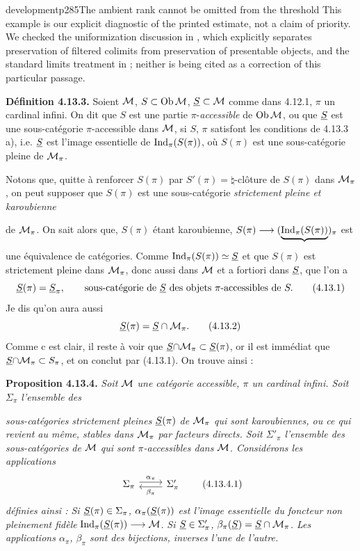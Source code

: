 \begin{dcomment}{development}{p285}{The ambient rank cannot be omitted from the threshold}
This example is our explicit diagnostic of the printed estimate, not a claim of priority. We checked the uniformization discussion in \citet[\S2.3]{Raptis2020}, which explicitly separates preservation of filtered colimits from preservation of presentable objects, and the standard limits treatment in \citet{Positselski2024Limits}; neither is being cited as a correction of this particular passage.
\end{dcomment}


\textbf{Définition 4.13.3.} Soient $\mathcal{M}$, $S \subset \operatorname{Ob}\mathcal{M}$, $\underline{S} \subset \mathcal{M}$ comme dans 4.12.1, $\pi$ un cardinal infini. On dit que $S$ est une partie $\pi$-\textit{accessible} de $\operatorname{Ob}\mathcal{M}$, ou que $\underline{S}$ est une sous-catégorie $\pi$-accessible dans $\mathcal{M}$, si $S$, $\pi$ satisfont les conditions de 4.13.3 a), i.e. $\underline{S}$ est l'image essentielle %
de $\mathrm{Ind}_\pi(S(\pi))$, où $S(\pi)$ est une sous-catégorie pleine de $\mathcal{M}_\pi$.

Notons que, quitte à renforcer $S(\pi)$ par $S'(\pi) = {\natural}$-clôture de $S(\pi)$ dans $\mathcal{M}_\pi$, on peut supposer que $S(\pi)$ est une sous-catégorie \textit{strictement pleine et karoubienne}

de $\mathcal{M}_\pi$. On sait alors que, $S(\pi)$ étant karoubienne, $S(\pi) \longrightarrow (\underbrace{\mathrm{Ind}_\pi(S(\pi))}_{})_\pi$ est une équivalence de catégories. Comme $\mathrm{Ind}_\pi(S(\pi)) \simeq \underline{S}$ et que $S(\pi)$ est strictement pleine dans $\mathcal{M}_\pi$, donc aussi dans $\mathcal{M}$ et a fortiori dans $\underline{S}$, que l'on a
\[
\underline{S}(\pi) = \underline{S}_\pi , \qquad \text{sous-catégorie de } \underline{S} \text{ des objets } \pi\text{-accessibles de } S. \tag*{(4.13.1)}
\]
Je dis qu'on aura aussi
\[
\underline{S}(\pi) = \underline{S} \cap \mathcal{M}_\pi . \tag*{(4.13.2)}
\]
Comme c est clair, il reste à voir que $\underline{S}{\cap}\mathcal{M}_\pi \subset \underline{S}(\pi)$, or il est immédiat que $\underline{S}{\cap}\mathcal{M}_\pi \subset S_\pi$, %
et on conclut par (4.13.1). On trouve ainsi :

\textbf{Proposition 4.13.4.} \textit{Soit $\mathcal{M}$ une catégorie accessible, $\pi$ un cardinal infini. Soit $\Sigma_\pi$ l'ensemble des}

\textit{sous-catégories strictement pleines $\underline{S}(\pi)$ de $\mathcal{M}_\pi$ qui sont karoubiennes, ou ce qui revient au même, stables dans $\mathcal{M}_\pi$ par facteurs directs. Soit $\Sigma'_\pi$ l'ensemble des sous-catégories de}
\textit{$\mathcal{M}$ qui sont $\pi$-accessibles dans $\mathcal{M}$. Considérons les applications}
\[
\begin{tikzcd}
\Sigma_\pi \arrow[r, shift left, "\alpha_\pi"] & \Sigma'_\pi \arrow[l, shift left, "\beta_\pi"]
\end{tikzcd}
\tag*{(4.13.4.1)}
\]
\textit{définies ainsi : Si $\underline{S}(\pi) \in \Sigma_\pi$, $\alpha_\pi(\underline{S}(\pi))$ est l'image essentielle du foncteur non pleinement fidèle} $\mathrm{Ind}_\pi(\underline{S}(\pi)) \longrightarrow \mathcal{M}$. \textit{Si $\underline{S} \in \Sigma'_\pi$, $\beta_\pi(\underline{S}) = \underline{S} \cap \mathcal{M}_\pi$. Les applications $\alpha_\pi$, $\beta_\pi$ sont des bijections, inverses l'une de l'autre.}

